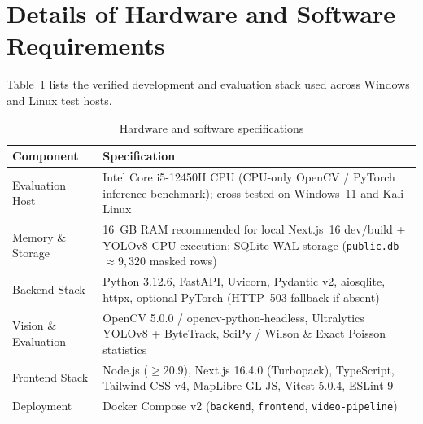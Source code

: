 \section{Details of Hardware and Software Requirements}
Table~\ref{tab:hw_sw} lists the verified development and evaluation stack used across Windows and Linux test hosts.

\begin{table}[!ht]
  \centering
  \caption{Hardware and software specifications}
  \label{tab:hw_sw}
  \begin{tabular}{@{}p{4.2cm}p{10.5cm}@{}}
    \toprule
    \textbf{Component} & \textbf{Specification} \\
    \midrule
    Evaluation Host & Intel Core i5-12450H CPU (CPU-only OpenCV / PyTorch inference benchmark); cross-tested on Windows~11 and Kali Linux \\
    Memory \& Storage & 16~GB RAM recommended for local Next.js~16 dev/build + YOLOv8 CPU execution; SQLite WAL storage (\texttt{public.db} $\approx 9,320$ masked rows) \\
    Backend Stack & Python 3.12.6, FastAPI, Uvicorn, Pydantic v2, aiosqlite, httpx, optional PyTorch (HTTP~503 fallback if absent) \\
    Vision \& Evaluation & OpenCV 5.0.0 / opencv-python-headless, Ultralytics YOLOv8 + ByteTrack, SciPy / Wilson \& Exact Poisson statistics \\
    Frontend Stack & Node.js ($\ge 20.9$), Next.js 16.4.0 (Turbopack), TypeScript, Tailwind CSS v4, MapLibre GL JS, Vitest 5.0.4, ESLint 9 \\
    Deployment & Docker Compose v2 (\texttt{backend}, \texttt{frontend}, \texttt{video-pipeline}) \\
    \bottomrule
  \end{tabular}
\end{table}
